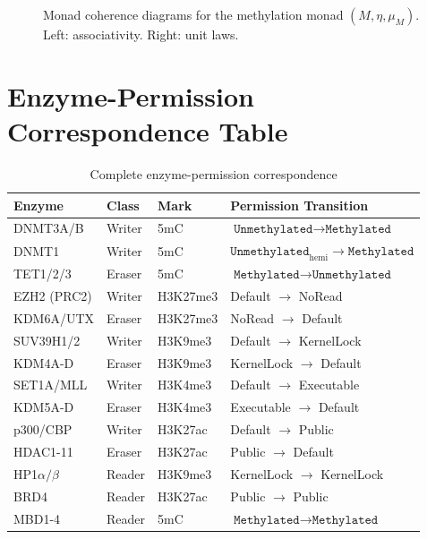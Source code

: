 \documentclass[12pt,a4paper]{article}
\newcommand{\Meth}{\texttt{Methylated}}
\newcommand{\Unmeth}{\texttt{Unmethylated}}
\newcommand{\id}{\mathrm{id}}
\begin{document}
\begin{figure}[H]
\centering
{}
\quad
{}
\caption{Monad coherence diagrams for the methylation monad $(M, \eta, \mu_M)$. Left: associativity. Right: unit laws.}
\label{fig:monad-coherence}
\end{figure}

\section{Enzyme-Permission Correspondence Table}
\label{app:enzyme-table}

\begin{table}[H]
\centering
\caption{Complete enzyme-permission correspondence}
\label{tab:enzyme-perm}
\begin{tabular}{llll}
\toprule
\textbf{Enzyme} & \textbf{Class} & \textbf{Mark} & \textbf{Permission Transition} \\
\midrule
DNMT3A/B & Writer & 5mC & $\Unmeth \to \Meth$ \\
DNMT1 & Writer & 5mC & $\Unmeth_{\mathrm{hemi}} \to \Meth$ \\
TET1/2/3 & Eraser & 5mC & $\Meth \to \Unmeth$ \\
EZH2 (PRC2) & Writer & H3K27me3 & Default $\to$ NoRead \\
KDM6A/UTX & Eraser & H3K27me3 & NoRead $\to$ Default \\
SUV39H1/2 & Writer & H3K9me3 & Default $\to$ KernelLock \\
KDM4A-D & Eraser & H3K9me3 & KernelLock $\to$ Default \\
SET1A/MLL & Writer & H3K4me3 & Default $\to$ Executable \\
KDM5A-D & Eraser & H3K4me3 & Executable $\to$ Default \\
p300/CBP & Writer & H3K27ac & Default $\to$ Public \\
HDAC1-11 & Eraser & H3K27ac & Public $\to$ Default \\
HP1$\alpha/\beta$ & Reader & H3K9me3 & KernelLock $\to$ KernelLock \\
BRD4 & Reader & H3K27ac & Public $\to$ Public \\
MBD1-4 & Reader & 5mC & $\Meth \to \Meth$ \\
\bottomrule
\end{tabular}
\end{table}
\end{document}
